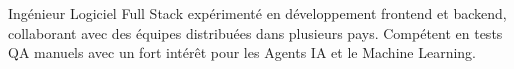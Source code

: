 \par{
Ingénieur Logiciel Full Stack expérimenté en développement frontend et backend, collaborant avec des équipes distribuées dans plusieurs pays. Compétent en tests QA manuels avec un fort intérêt pour les Agents IA et le Machine Learning.
}
